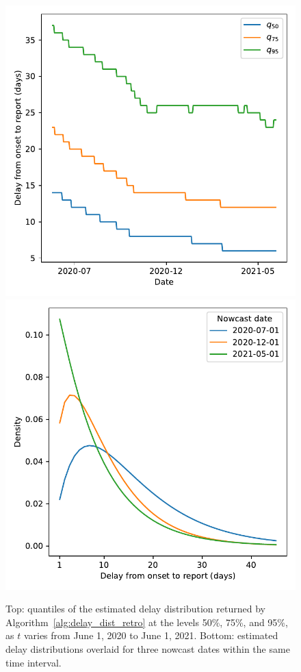 \documentclass[sts]{imsart}
\theoremstyle{plain}
\theoremstyle{definition}
\theoremstyle{remark}
\begin{document}
\begin{figure}[tb]
\centering
\includegraphics[width=0.9\linewidth]{./figures/finalized_delay_quantiles.pdf}
\includegraphics[width=0.9\linewidth]{./figures/overlay_finalized_delay_dist.pdf}
\caption{Top: quantiles of the estimated delay distribution returned by 
  Algorithm~\ref{alg:delay_dist_retro} at the levels 50\%, 75\%, and 95\%, as 
  $t$ varies from June 1, 2020 to June 1, 2021. Bottom: estimated delay
  distributions overlaid for three nowcast dates within the same time
  interval.}    
	\label{fig:line_list_time}
\end{figure}
\end{document}
